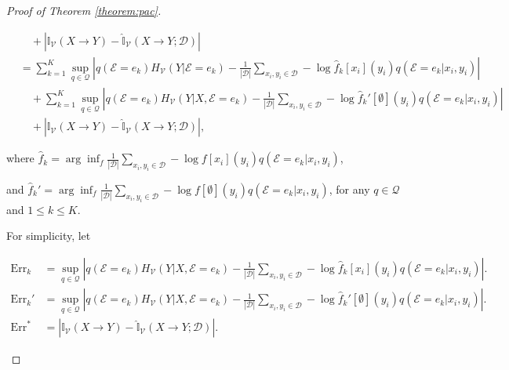 \begin{proof}[Proof of Theorem \ref{theorem:pac}]
\begin{small}
\begin{align}
    &\quad + \left| \mathbb{I}_{\mathcal{V}}(X\rightarrow Y) - \hat{\mathbb{I}}_{\mathcal{V}}(X\rightarrow Y;\mathcal D)  \right| \\ 
    &= \sum_{k=1}^K \sup_{q\in \mathcal Q}\left| {q}(\mathcal E=e_k)H_{\mathcal V}(Y|\mathcal E=e_k) - \frac{1}{|\mathcal D|} \sum_{x_i,y_i \in \mathcal D} -\log \hat{f}_k[x_i](y_i) q(\mathcal E=e_k|x_i,y_i) \right| \\
    &\quad + \sum_{k=1}^K \sup_{q \in \mathcal Q}\left| {q}(\mathcal E=e_k)H_{\mathcal V}(Y|X, \mathcal E=e_k) 
    - \frac{1}{|\mathcal D|} \sum_{x_i,y_i \in \mathcal D} -\log \hat{f}_k'[\emptyset](y_i) q(\mathcal E=e_k|x_i,y_i) \right| \\
    &\quad + \left| \mathbb{I}_{\mathcal{V}}(X\rightarrow Y) - \hat{\mathbb{I}}_{\mathcal{V}}(X\rightarrow Y;\mathcal D)  \right|,
\end{align}
\end{small}
where $\hat f_k = \arg \inf_f \frac{1}{|\mathcal D|}  \sum_{x_i,y_i \in \mathcal D} -\log f[x_i](y_i) q(\mathcal E=e_k|x_i,y_i)$,

and $\hat f_k' = \arg \inf_f \frac{1}{|\mathcal D|}  \sum_{x_i,y_i \in \mathcal D} -\log f[\emptyset](y_i) q(\mathcal E=e_k|x_i,y_i)$, for any $q\in \mathcal Q$ and $1\leq k \leq K$. 

For simplicity, let
\begin{small}
\begin{align}
    \mathrm {Err}_k &= \sup_{q \in \mathcal Q}\left| {q}(\mathcal E=e_k)H_{\mathcal V}(Y|X, \mathcal E=e_k) 
    - \frac{1}{|\mathcal D|} \sum_{x_i,y_i \in \mathcal D} -\log \hat{f}_k[x_i](y_i) q(\mathcal E=e_k|x_i,y_i) \right|. \\
    \mathrm {Err}_k' &= \sup_{q \in \mathcal Q}\left| {q}(\mathcal E=e_k)H_{\mathcal V}(Y|X, \mathcal E=e_k) 
    - \frac{1}{|\mathcal D|} \sum_{x_i,y_i \in \mathcal D} -\log \hat{f}_k'[\emptyset](y_i) q(\mathcal E=e_k|x_i,y_i) \right|. \\
    \mathrm {Err}^* &= \left| \mathbb{I}_{\mathcal{V}}(X\rightarrow Y) - \hat{\mathbb{I}}_{\mathcal{V}}(X\rightarrow Y;\mathcal D)  \right|.
\end{align}
\end{small}


\end{proof}
